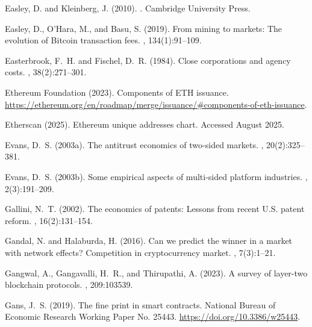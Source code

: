 \documentclass[12pt]{article}
\begin{document}
\begin{thebibliography}{}
Easley, D. and Kleinberg, J. (2010).
.
\newblock Cambridge University Press.

Easley, D., O'Hara, M., and Basu, S. (2019).
\newblock From mining to markets: The evolution of Bitcoin transaction fees.
, 134(1):91--109.

Easterbrook, F.~H. and Fischel, D.~R. (1984).
\newblock Close corporations and agency costs.
, 38(2):271--301.

{Ethereum Foundation} (2023).
\newblock Components of ETH issuance.
\newblock
  \url{https://ethereum.org/en/roadmap/merge/issuance/#components-of-eth-issuance}.

{Etherscan} (2025).
\newblock Ethereum unique addresses chart.
\newblock Accessed August 2025.

Evans, D.~S. (2003a).
\newblock The antitrust economics of two-sided markets.
, 20(2):325--381.

Evans, D.~S. (2003b).
\newblock Some empirical aspects of multi-sided platform industries.
, 2(3):191--209.

Gallini, N.~T. (2002).
\newblock The economics of patents: Lessons from recent U.S. patent reform.
, 16(2):131--154.

Gandal, N. and Halaburda, H. (2016).
\newblock Can we predict the winner in a market with network effects?
  Competition in cryptocurrency market.
, 7(3):1--21.

Gangwal, A., Gangavalli, H.~R., and Thirupathi, A. (2023).
\newblock A survey of layer-two blockchain protocols.
, 209:103539.

Gans, J.~S. (2019).
\newblock The fine print in smart contracts.
\newblock National Bureau of Economic Research Working Paper No. 25443.
\newblock \url{https://doi.org/10.3386/w25443}.


\end{thebibliography}
\end{document}
